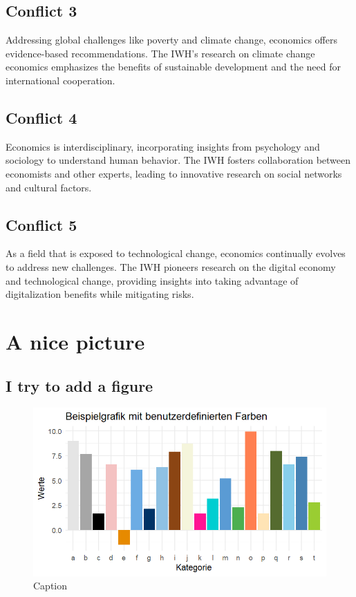 \documentclass{article}
\begin{document}
\subsection{Conflict 3}
Addressing global challenges like poverty and climate change, economics offers evidence-based recommendations. The IWH's research on climate change economics emphasizes the benefits of sustainable development and the need for international cooperation.

\subsection{Conflict 4}
Economics is interdisciplinary, incorporating insights from psychology and sociology to understand human behavior. The IWH fosters collaboration between economists and other experts, leading to innovative research on social networks and cultural factors.

\subsection{Conflict 5}
As a field that is exposed to technological change, economics continually evolves to address new challenges. The IWH pioneers research on the digital economy and technological change, providing insights into taking advantage of digitalization benefits while mitigating risks.


\section{A nice picture}
\subsection{I try to add a figure}
\begin{figure}[h]
  \centering
  \includegraphics[width=\textwidth]{Figures/efn/plot_example.png}
  \caption{Caption}
\end{figure}
\end{document}
